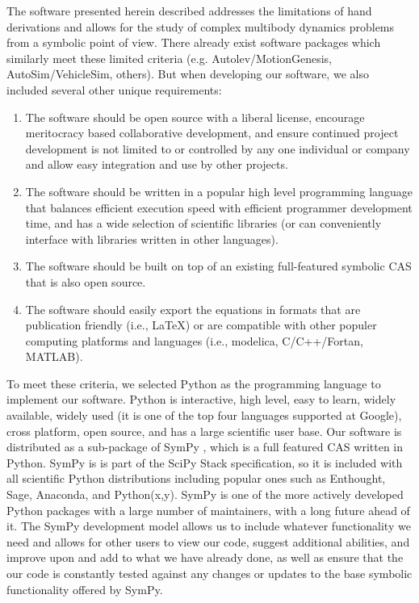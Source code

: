 \documentclass[twocolumn,10pt]{asme2e}
\begin{document}
The software presented herein described addresses the limitations of hand
derivations and allows for the study of complex multibody dynamics problems
from a symbolic point of view. There already exist software packages which
similarly meet these limited criteria (e.g. Autolev/MotionGenesis,
AutoSim/VehicleSim, others). But when developing our software, we also
included several other unique requirements:
\begin{enumerate}
  \item The software should be open source with a liberal license, encourage
  meritocracy based collaborative development, and ensure continued project
  development is not limited to or controlled by any one individual or company
  and allow easy integration and use by other projects.

  \item The software should be written in a popular high level programming
  language that balances efficient execution speed with efficient programmer
  development time, and has a wide selection of scientific libraries (or can
  conveniently interface with libraries written in other languages).

  \item The software should be built on top of an existing full-featured
  symbolic CAS that is also open source.

  \item The software should easily export the equations in formats that are
  publication friendly (i.e., \LaTeX) or are compatible with other populer
  computing platforms and languages (i.e., modelica, C/C++/Fortan, MATLAB).
\end{enumerate}
To meet these criteria, we selected Python as the programming language to
implement our software. Python is interactive, high level, easy to learn,
widely available, widely used (it is one of the top four languages supported at
Google), cross platform, open source, and has a large scientific user base.
Our software is distributed as a sub-package of SymPy \cite{SymPy2012}, which
is a full featured CAS written in
Python. SymPy is is part of the SciPy Stack \cite{SciPy} specification,
so it is included with all scientific Python distributions including popular
ones such as Enthought, Sage, Anaconda, and Python(x,y). SymPy is one of the
more actively developed Python packages with a large number of maintainers,
with a long future ahead of it. The SymPy development model allows us to
include whatever functionality we need and allows for other users to view our
code, suggest additional abilities, and improve upon and add to what we have
already done, as well as ensure that the our code is constantly tested against
any changes or updates to the base symbolic functionality offered by SymPy.
\end{document}
